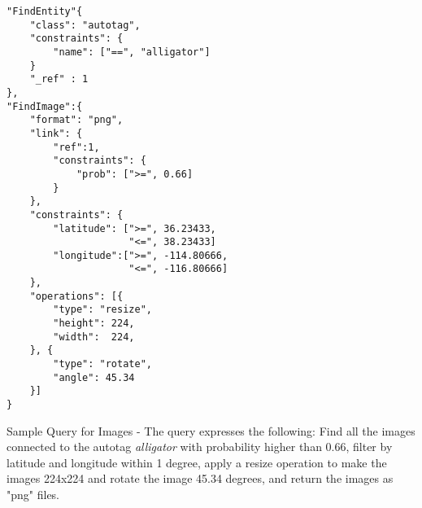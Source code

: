 \begin{appendix}
\begin{listing}[t!]
\begin{verbatim}
"FindEntity"{     
    "class": "autotag",
    "constraints": { 
        "name": ["==", "alligator"]
    }
    "_ref" : 1
},
"FindImage":{
    "format": "png",
    "link": {
        "ref":1,
        "constraints": {
            "prob": [">=", 0.66]
        }
    }, 
    "constraints": {
        "latitude": [">=", 36.23433, 
                     "<=", 38.23433]
        "longitude":[">=", -114.80666, 
                     "<=", -116.80666]
    },
    "operations": [{
        "type": "resize",
        "height": 224,
        "width":  224,
    }, {
        "type": "rotate",
        "angle": 45.34
    }]
}

\end{verbatim}
\caption{Sample Query for Images - 
The query expresses the following: 
Find all the images connected to the autotag \textit{alligator} 
with probability higher than 0.66, 
filter by latitude and longitude within 1 degree, 
apply a resize operation to make the images 224x224
and rotate the image 45.34 degrees, 
and return the images as "png" files.} 
\label{findimagegeo}
\end{listing}

\end{appendix}
